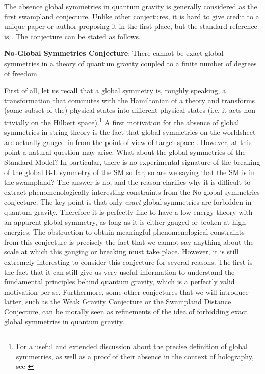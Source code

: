 \documentclass[11pt,a4paper]{article}
\begin{document}
The absence global symmetries in quantum gravity is generally considered as the first swampland conjecture. Unlike other conjectures, it is hard to give credit to a unique paper or author proposing it in the first place, but the standard reference is \cite{Banks:2010zn}. The conjecture can be stated as follows.
\vspace{0.2cm}

\begin{tcolorbox}[colback=boxblue]
\textbf{No-Global Symmetries Conjecture}: There cannot be exact global symmetries in a theory of quantum gravity coupled to a finite number of degrees of freedom.
\end{tcolorbox}

First of all, let us recall that a global symmetry is, roughly speaking,  a transformation that commutes with the Hamiltonian of a theory and transforms (some subset of the) physical states into different physical states (i.e. it acts non-trivially on the Hilbert space).\footnote{For a useful and extended discussion about the precise definition of global symmetries, as well as a proof of their absence in the context of holography, see \cite{Harlow:2018jwu,Harlow:2018tng}} A first motivation for the absence of global symmetries in string theory is the fact that global symmetries on the worldsheet are actually gauged in from the point of view of target space \cite{Banks:1988yz}. However, at this point a natural question may arise: What about the global symmetries of the Standard Model? In particular, there is no experimental signature of the breaking of the global B-L symmetry of the SM so far, so are we saying that the SM is in the swampland? The answer is no, and the reason clarifies why it is difficult to extract phenomenologically interesting constraints from the No-global symmetries conjecture. The key point is that only \emph{exact} global symmetries are forbidden in quantum gravity. Therefore it is perfectly fine to have a low energy theory with an apparent global symmetry, as long as it is either gauged or broken at high-energies. The obstruction to obtain meaningful phenomenological constraints from this conjecture is precisely the fact that we cannot say anything about the scale at which this gauging or breaking must take place. However, it is still extremely interesting to consider this conjecture for several reasons. The first is the fact that it can still give us very useful information to understand the fundamental principles behind quantum gravity, which is a perfectly valid motivation per se. Furthermore, some other conjectures that we will introduce latter, such as the Weak Gravity Conjecture or the Swampland Distance Conjecture, can be morally seen as refinements of the idea of forbidding exact global symmetries in quantum gravity. 
\end{document}
